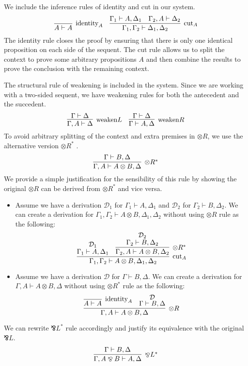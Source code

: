\documentclass[12pt, openany]{memoir}
\newcommand*{\pare}[0]{\mathbin{\bindnasrepma}}
\begin{document}
We include the inference rules of identity and cut in our system.
\[
  \infer[\text{identity}_A]{A \vdash A}{}
  \quad
  \infer[\text{cut}_A]{\Gamma_1, \Gamma_2 \vdash \Delta_1, \Delta_2}{
    \Gamma_1 \vdash A, \Delta_1
    &
    \Gamma_2, A \vdash \Delta_2
  }
\]
The identity rule closes the proof by ensuring that there is only one identical proposition on each side of the sequent. 
The cut rule allows us to split the context to prove some arbitrary propositions $A$ 
and then combine the results to prove the conclusion with the remaining context.

The structural rule of weakening is included in the system. Since we are working with a two-sided sequent, 
we have weakening rules for both the antecedent and the succedent.
\[
  \infer[\text{weaken}L]{
    \Gamma, A \vdash \Delta
  }{
    \Gamma \vdash \Delta
  }
  \quad
  \infer[\text{weaken}R]{
    \Gamma \vdash A, \Delta
  }{
    \Gamma \vdash \Delta
  }
\]
To avoid arbitrary splitting of the context and extra premises in $\otimes R$, we use the alternative version $\otimes R^*$ \cite{Caires2010}.
\[
  \infer[\otimes R^*]{\Gamma, A \vdash A \otimes B, \Delta}{
    \Gamma \vdash B, \Delta
  }
\]
We provide a simple justification for the sensibility of this rule by showing the original $\otimes R$ can be derived from $\otimes R^*$ and vice versa.
\begin{itemize}
  \item Assume we have a derivation $\mathcal{D}_1$ for $\Gamma_1 \vdash A, \Delta_1$ and $\mathcal{D}_2$ for $\Gamma_2 \vdash B, \Delta_2$.
  We can create a derivation for $\Gamma_1, \Gamma_2 \vdash A \otimes B, \Delta_1, \Delta_2$ without using $\otimes R$ rule as the following:
  \[
    \infer[\text{cut}_A]{\Gamma_1, \Gamma_2 \vdash A \otimes B, \Delta_1, \Delta_2}{
      \deduce{\Gamma_1 \vdash A, \Delta_1}{\mathcal{D}_1}
      &
      \infer[\otimes R^*]{\Gamma_2, A \vdash A \otimes B, \Delta_2}{
        \deduce{\Gamma_2 \vdash B, \Delta_2}{\mathcal{D}_2}
      }
    }
  \]
  \item Assume we have a derivation $\mathcal{D}$ for $\Gamma \vdash B, \Delta$.
  We can create a derivation for $\Gamma, A \vdash A \otimes B, \Delta$ without using $\otimes R^*$ rule as the following:
  \[
    \infer[\otimes R]{\Gamma, A \vdash A \otimes B, \Delta}{
      \infer[\text{identity}_A]{A \vdash A}{}
      &
      \deduce{\Gamma \vdash B, \Delta}{\mathcal{D}}
    }
  \]
\end{itemize}
We can rewrite $\pare L^*$ rule accordingly and justify its equivalence with the original $\pare L$. 
\[
  \infer[\pare L^*]{\Gamma, A \pare B \vdash A, \Delta}{
    \Gamma \vdash B, \Delta
  }
\]
\end{document}
